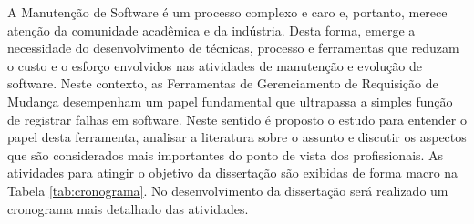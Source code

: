 \documentclass[msc,proposal,hidelot,hideabstract]{ppgccufmg} %
\begin{document}
A Manutenção de Software é um processo complexo e caro e, portanto,  merece atenção da
comunidade acadêmica e da indústria. Desta forma, emerge a necessidade do desenvolvimento de técnicas, processo e ferramentas que reduzam o custo e o esforço envolvidos nas atividades de manutenção e evolução de software. Neste contexto, as Ferramentas de Gerenciamento de Requisição de Mudança desempenham um papel fundamental que ultrapassa a simples função de registrar falhas em software. Neste sentido é proposto o estudo para entender o papel desta ferramenta, analisar a literatura sobre o assunto e discutir os aspectos que são considerados mais importantes do ponto de vista dos profissionais. As atividades para atingir o objetivo da dissertação são exibidas de forma macro na Tabela \ref{tab:cronograma}. No desenvolvimento da dissertação será realizado um
cronograma mais detalhado das atividades.
\end{document}
